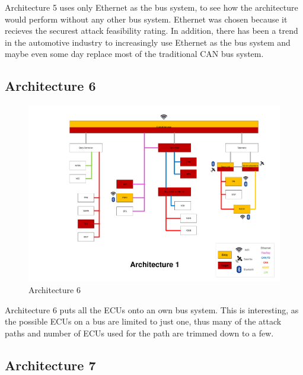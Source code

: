 Architecture 5 uses only Ethernet as the bus system, to see how the architecture would perform without any other bus system.
Ethernet was chosen because it recieves the securest attack feasibility rating.
In addition, there has been a trend in the automotive industry to increasingly use Ethernet as the bus system and maybe even some day replace most of the traditional CAN bus system.\par


\subsection{Architecture 6}
\label{subsec:arch6}

\begin{figure}[h!]
    \caption{Architecture 6}
    \includegraphics[width=\textwidth, page=6]{../Architectures-survey.pdf}
\end{figure}

Architecture 6 puts all the ECUs onto an own bus system.
This is interesting, as the possible ECUs on a bus are limited to just one, thus many of the attack paths and number of ECUs used for the path are trimmed down to a few.
\par


\subsection{Architecture 7}
\label{subsec:arch7}

